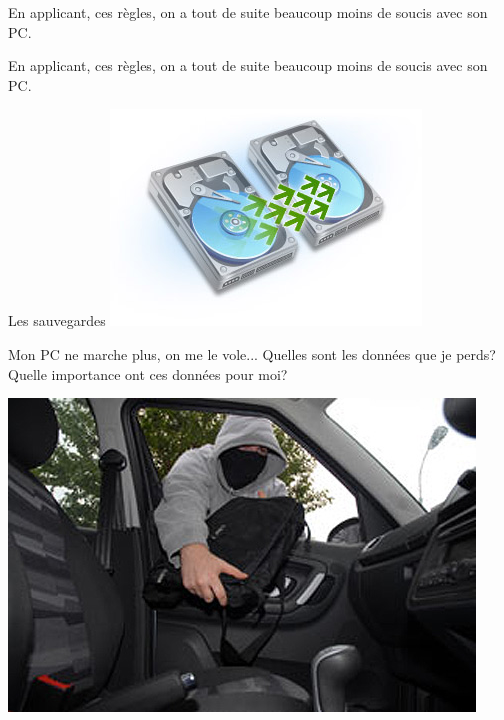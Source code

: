 \documentclass{beamer}
\begin{document}
\begin{frame}
\begin{center}
\Huge{En applicant, ces règles, on a tout de suite beaucoup moins de soucis avec son PC.}
\end{center}
\end{frame}

\begin{frame}
\begin{center}
\Huge{En applicant, ces règles, on a tout de suite beaucoup moins de soucis avec son PC.}
\end{center}
\end{frame}
\begin{frame}
\begin{center}
\Huge{Les sauvegardes}
\includegraphics[scale=0.5] {./images/backup.jpg}
\end{center}
\end{frame}

\begin{frame}
\begin{center}
\Huge{Mon PC ne marche plus, on me le vole...
Quelles sont les données que je perds?
Quelle importance ont ces données pour moi?
}

\includegraphics[scale=0.5] {./images/laptopthief.jpg}
\end{center}
\end{frame}
\end{document}

